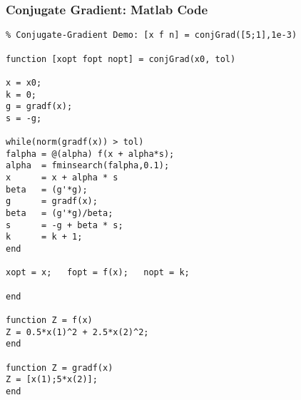 \documentclass[xcolor=dvipsnames,11pt]{beamer}
\newif\ifplacelogo %
\begin{document}
\begin{frame}[fragile]
\frametitle{Conjugate Gradient: Matlab Code}
\vspace{-3pt}
\begin{lstlisting}
% Conjugate-Gradient Demo: [x f n] = conjGrad([5;1],1e-3)

function [xopt fopt nopt] = conjGrad(x0, tol)

x = x0;
k = 0;
g = gradf(x);
s = -g;

while(norm(gradf(x)) > tol)	
falpha = @(alpha) f(x + alpha*s);
alpha  = fminsearch(falpha,0.1);
x      = x + alpha * s
beta   = (g'*g);
g      = gradf(x);
beta   = (g'*g)/beta;
s      = -g + beta * s;
k      = k + 1;
end

xopt = x;   fopt = f(x);   nopt = k;

end

function Z = f(x)
Z = 0.5*x(1)^2 + 2.5*x(2)^2;
end

function Z = gradf(x)
Z = [x(1);5*x(2)];
end
\end{lstlisting}
\end{frame}

%
%
%
%
%
%
%
%
%
%
\end{document}
